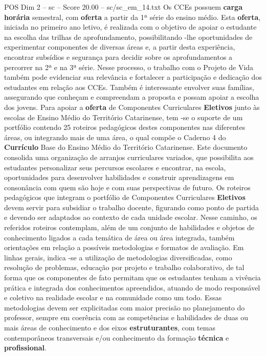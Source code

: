 \begin{textsample}{POS Dim 2 – sc – Score 20.00 – sc/sc\_em\_14.txt}
Os CCEs possuem \textbf{carga} \textbf{horária} semestral, com \textbf{oferta} a partir da 1ª série do ensino médio.
Esta \textbf{oferta}, iniciada no primeiro ano letivo, é realizada com o objetivo de apoiar o estudante na escolha das trilhas de aprofundamento, possibilitando -lhe oportunidades de experimentar componentes de diversas áreas e, a partir desta experiência, encontrar subsídios e segurança para decidir sobre os aprofundamentos a percorrer na 2ª e na 3ª série.
Nesse processo, o trabalho com o Projeto de Vida também pode evidenciar sua relevância e fortalecer a participação e dedicação dos estudantes em relação aos CCEs.
Também é interessante envolver suas famílias, assegurando que conheçam e compreendam a proposta e possam apoiar a escolha dos jovens.
Para apoiar a \textbf{oferta} de Componentes Curriculares \textbf{Eletivos} junto às escolas de Ensino Médio do Território Catarinense, tem -se o suporte de um portfólio contendo 25 roteiros pedagógicos destes componentes nas diferentes áreas, ou integrando mais de uma área, o qual compõe o Caderno 4 do \textbf{Currículo} Base do Ensino Médio do Território Catarinense.
Este documento consolida uma organização de arranjos curriculares variados, que possibilita aos estudantes personalizar seus percursos escolares e encontrar, na escola, oportunidades para desenvolver habilidades e construir aprendizagens em consonância com quem são hoje e com suas perspectivas de futuro.
Os roteiros pedagógicos que integram o portfólio de Componentes Curriculares \textbf{Eletivos} devem servir para subsidiar o trabalho docente, figurando como ponto de partida e devendo ser adaptados ao contexto de cada unidade escolar.
Nesse caminho, os referidos roteiros contemplam, além de um conjunto de habilidades e objetos de conhecimento ligados a cada temática de área ou área integrada, também orientações em relação a possíveis metodologias e formatos de avaliação.
Em linhas gerais, indica -se a utilização de metodologias diversificadas, como resolução de problemas, educação por projeto e trabalho colaborativo, de tal forma que os componentes de fato permitam que os estudantes tenham a vivência prática e integrada dos conhecimentos apreendidos, atuando de modo responsável e coletivo na realidade escolar e na comunidade como um todo.
Essas metodologias devem ser explicitadas com maior precisão no planejamento do professor, sempre em coerência com as competências e habilidades de duas ou mais áreas de conhecimento e dos eixos \textbf{estruturantes}, com temas contemporâneos transversais e/ou conhecimento da formação \textbf{técnica} e \textbf{profissional}.

\end{textsample}
